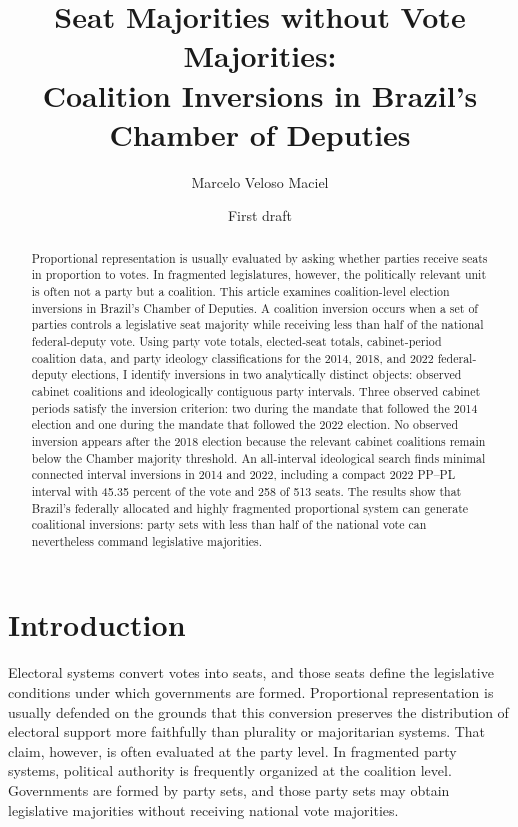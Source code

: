 \documentclass[11pt]{article}
\title{Seat Majorities without Vote Majorities:\\[0.3em]Coalition Inversions in Brazil's Chamber of Deputies}
\author{Marcelo Veloso Maciel}
\date{First draft}
\begin{document}
\maketitle

\begin{abstract}
  Proportional representation is usually evaluated by asking whether parties
  receive seats in proportion to votes. In fragmented legislatures, however, the
  politically relevant unit is often not a party but a coalition. This article
  examines coalition-level election inversions in Brazil's Chamber of Deputies.
  A coalition inversion occurs when a set of parties controls a legislative seat
  majority while receiving less than half of the national federal-deputy vote.
  Using party vote totals, elected-seat totals, cabinet-period coalition data,
  and party ideology classifications for the 2014, 2018, and 2022 federal-deputy
  elections, I identify inversions in two analytically distinct objects:
  observed cabinet coalitions and ideologically contiguous party intervals.
  Three observed cabinet periods satisfy the inversion criterion: two during the
  mandate that followed the 2014 election and one during the mandate that
  followed the 2022 election. No observed inversion appears after the 2018
  election because the relevant cabinet coalitions remain below the Chamber
  majority threshold. An all-interval ideological search finds minimal
  connected interval inversions in 2014 and 2022, including a compact 2022 PP--PL
  interval with 45.35 percent of the vote and 258 of 513 seats. The results show
  that Brazil’s federally allocated and highly fragmented proportional system
  can generate coalitional inversions: party sets with less than half of the
  national vote can nevertheless command legislative majorities.
\end{abstract}


\section{Introduction}

Electoral systems convert votes into seats, and those seats define the legislative conditions under which governments are formed. Proportional representation is usually defended on the grounds that this conversion preserves the distribution of electoral support more faithfully than plurality or majoritarian systems. That claim, however, is often evaluated at the party level. In fragmented party systems, political authority is frequently organized at the coalition level. Governments are formed by party sets, and those party sets may obtain legislative majorities without receiving national vote majorities.
\end{document}
